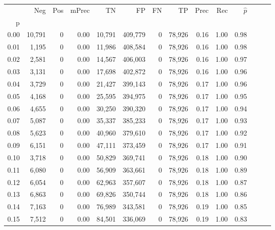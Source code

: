 \begin{tabular}{rrrrrrrrrrrrrr}
\toprule
{} &     Neg &    Pos & mPrec &       TN &       FP &      FN &      TP &  Prec &   Rec & $\hat{p}$ \\
p    &         &        &       &          &          &         &         &       &       &           \\
\midrule
0.00 &  10,791 &      0 &  0.00 &   10,791 &  409,779 &       0 &  78,926 &  0.16 &  1.00 &      0.98 \\
0.01 &   1,195 &      0 &  0.00 &   11,986 &  408,584 &       0 &  78,926 &  0.16 &  1.00 &      0.98 \\
0.02 &   2,581 &      0 &  0.00 &   14,567 &  406,003 &       0 &  78,926 &  0.16 &  1.00 &      0.97 \\
0.03 &   3,131 &      0 &  0.00 &   17,698 &  402,872 &       0 &  78,926 &  0.16 &  1.00 &      0.96 \\
0.04 &   3,729 &      0 &  0.00 &   21,427 &  399,143 &       0 &  78,926 &  0.17 &  1.00 &      0.96 \\
0.05 &   4,168 &      0 &  0.00 &   25,595 &  394,975 &       0 &  78,926 &  0.17 &  1.00 &      0.95 \\
0.06 &   4,655 &      0 &  0.00 &   30,250 &  390,320 &       0 &  78,926 &  0.17 &  1.00 &      0.94 \\
0.07 &   5,087 &      0 &  0.00 &   35,337 &  385,233 &       0 &  78,926 &  0.17 &  1.00 &      0.93 \\
0.08 &   5,623 &      0 &  0.00 &   40,960 &  379,610 &       0 &  78,926 &  0.17 &  1.00 &      0.92 \\
0.09 &   6,151 &      0 &  0.00 &   47,111 &  373,459 &       0 &  78,926 &  0.17 &  1.00 &      0.91 \\
0.10 &   3,718 &      0 &  0.00 &   50,829 &  369,741 &       0 &  78,926 &  0.18 &  1.00 &      0.90 \\
0.11 &   6,080 &      0 &  0.00 &   56,909 &  363,661 &       0 &  78,926 &  0.18 &  1.00 &      0.89 \\
0.12 &   6,054 &      0 &  0.00 &   62,963 &  357,607 &       0 &  78,926 &  0.18 &  1.00 &      0.87 \\
0.13 &   6,863 &      0 &  0.00 &   69,826 &  350,744 &       0 &  78,926 &  0.18 &  1.00 &      0.86 \\
0.14 &   7,163 &      0 &  0.00 &   76,989 &  343,581 &       0 &  78,926 &  0.19 &  1.00 &      0.85 \\
0.15 &   7,512 &      0 &  0.00 &   84,501 &  336,069 &       0 &  78,926 &  0.19 &  1.00 &      0.83 \\

\end{tabular}
